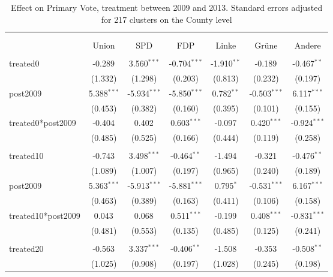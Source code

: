 \documentclass[12pt]{article}
\begin{document}
 
\begin{table}[!htbp] \centering
  \caption{Effect on Primary Vote, treatment between 2009 and 2013. Standard errors adjusted for 217 clusters on the County level}
\begin{tabular}{@{\extracolsep{5pt}}lcccccc}
\\[-1.8ex]\hline
\hline \\[-1.8ex]
\\[-1.8ex] & \multicolumn{1}{c}{Union} & \multicolumn{1}{c}{SPD} & \multicolumn{1}{c}{FDP} & \multicolumn{1}{c}{Linke} & \multicolumn{1}{c}{Grüne} & \multicolumn{1}{c}{Andere}  \\
\hline \\[-1.8ex]
 treated0 & -0.289$^{}$ & 3.560$^{***}$ & -0.704$^{***}$ & -1.910$^{**}$ & -0.189$^{}$ & -0.467$^{**}$ \\
  & (1.332) & (1.298) & (0.203) & (0.813) & (0.232) & (0.197) \\
 post2009 & 5.388$^{***}$ & -5.934$^{***}$ & -5.850$^{***}$ & 0.782$^{**}$ & -0.503$^{***}$ & 6.117$^{***}$ \\
  & (0.453) & (0.382) & (0.160) & (0.395) & (0.101) & (0.155) \\
 treated0*post2009 & -0.404$^{}$ & 0.402$^{}$ & 0.603$^{***}$ & -0.097$^{}$ & 0.420$^{***}$ & -0.924$^{***}$ \\
  & (0.485) & (0.525) & (0.166) & (0.444) & (0.119) & (0.258) \\
\hline \\[-1.8ex]
 treated10 & -0.743$^{}$ & 3.498$^{***}$ & -0.464$^{**}$ & -1.494$^{}$ & -0.321$^{}$ & -0.476$^{**}$ \\
  & (1.089) & (1.007) & (0.197) & (0.965) & (0.240) & (0.189) \\
 post2009 & 5.363$^{***}$ & -5.913$^{***}$ & -5.881$^{***}$ & 0.795$^{*}$ & -0.531$^{***}$ & 6.167$^{***}$ \\
  & (0.463) & (0.389) & (0.163) & (0.411) & (0.106) & (0.158) \\
 treated10*post2009 & 0.043$^{}$ & 0.068$^{}$ & 0.511$^{***}$ & -0.199$^{}$ & 0.408$^{***}$ & -0.831$^{***}$ \\
  & (0.481) & (0.553) & (0.135) & (0.485) & (0.125) & (0.241) \\
\hline \\[-1.8ex]
 treated20 & -0.563$^{}$ & 3.337$^{***}$ & -0.406$^{**}$ & -1.508$^{}$ & -0.353$^{}$ & -0.508$^{**}$ \\
  & (1.025) & (0.908) & (0.197) & (1.028) & (0.245) & (0.198) \\

\end{tabular}
\end{table}
\end{document}
